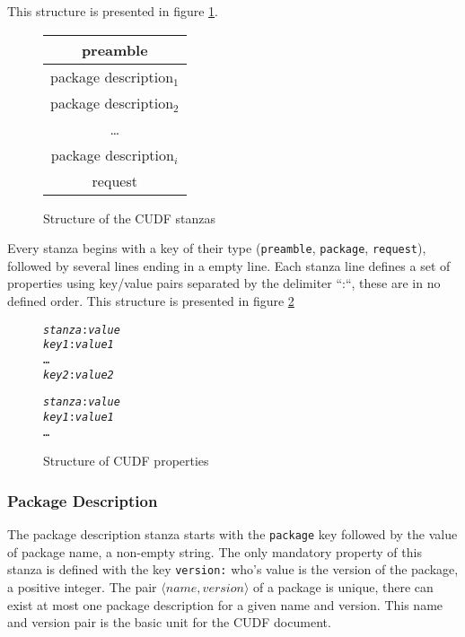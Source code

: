 This structure is presented in figure \ref{formal:cudfstruct}.

\begin{figure}[htp]
\centering
\begin{tabular}{|c|}
\hline preamble \\ \hline
\hline package description$_{1}$ \\ \hline
\hline package description$_{2}$ \\ \hline
 \multicolumn{1}{c}{\ldots}  \\ 
\hline package description$_{i}$\\ \hline
\hline request\\ \hline
\end{tabular}
\caption{Structure of the CUDF stanzas}
\label{formal:cudfstruct}
\end{figure}

Every stanza begins with a key of their type (\verb+preamble+, \verb+package+, \verb+request+), followed by several lines ending in a empty line.
Each stanza line defines a set of properties using key/value pairs separated by the delimiter ``:``, these are in no defined order.
This structure is presented in figure \ref{formal.cudfproperties}

\begin{figure}[htp] 
\begin{center}
\begin{alltt}
\textit{stanza}: \textit{value}
\textit{key1}: \textit{value1}
\ldots
\textit{key2}: \textit{value2}

\textit{stanza}: \textit{value}
\textit{key1}: \textit{value1}
\ldots
\end{alltt}
  \caption[CUDF property structure]{Structure of CUDF properties}
  \label{formal.cudfproperties}
\end{center}
\end{figure}

\subsubsection{Package Description}
The package description stanza starts with the \verb+package+ key followed by the value of package name, a non-empty string.
The only mandatory property of this stanza is defined with the key \verb+version:+ who's value is the version of the package, a positive integer.
The pair $\langle name, version \rangle$ of a package is unique, there can exist at most one package description for a given name and version.
This name and version pair is the basic unit for the CUDF document. 

